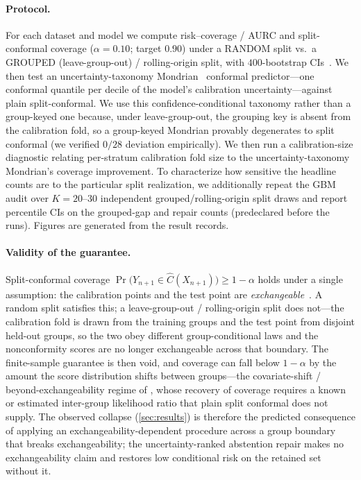 \documentclass[11pt]{article}
\begin{document}
\paragraph{Protocol.} For each dataset and model we compute risk--coverage / AURC and split-conformal coverage
($\alpha=0.10$; target $0.90$) under a RANDOM split vs.\ a GROUPED (leave-group-out) / rolling-origin split,
with $400$-bootstrap CIs~\citep{vovk2005algorithmic,angelopoulos2023conformal}. We then test an
uncertainty-taxonomy Mondrian~\citep{vovk2003mondrian} conformal predictor---one conformal quantile per
decile of the model's calibration uncertainty---against plain split-conformal. We use this
confidence-conditional taxonomy rather than a group-keyed one because, under leave-group-out, the grouping key
is absent from the calibration fold, so a group-keyed Mondrian provably degenerates to split conformal (we
verified $0/28$ deviation empirically). We then run a calibration-size diagnostic relating per-stratum
calibration fold size to the uncertainty-taxonomy Mondrian's coverage improvement. To characterize how sensitive the headline
counts are to the particular split realization, we additionally repeat the GBM audit over $K{=}20$--$30$
independent grouped/rolling-origin split draws and report percentile CIs on the grouped-gap and repair counts
(predeclared before the runs). Figures are generated from the result records.
\paragraph{Validity of the guarantee.} Split-conformal coverage
$\Pr\!\big(Y_{n+1}\in\hat C(X_{n+1})\big)\ge 1-\alpha$ holds under a single assumption: the calibration points
and the test point are \emph{exchangeable}~\citep{vovk2005algorithmic,lei2018distribution}. A random split
satisfies this; a leave-group-out / rolling-origin split does not---the calibration fold is drawn from the
training groups and the test point from disjoint held-out groups, so the two obey different group-conditional
laws and the nonconformity scores are no longer exchangeable across that boundary. The finite-sample guarantee
is then void, and coverage can fall below $1-\alpha$ by the amount the score distribution shifts between
groups---the covariate-shift / beyond-exchangeability regime of \citet{tibshirani2019covariate,barber2023beyond},
whose recovery of coverage requires a known or estimated inter-group likelihood ratio that plain split conformal
does not supply. The observed collapse (\cref{sec:results}) is therefore the predicted consequence of
applying an exchangeability-dependent procedure across a group boundary that breaks exchangeability; the
uncertainty-ranked abstention repair makes no exchangeability claim and restores low conditional risk on
the retained set without it.
\end{document}
